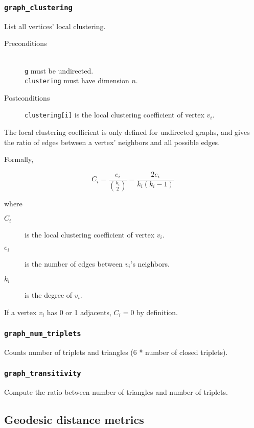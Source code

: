 \documentclass[a4paper,10pt]{article}
\begin{document}
\subsubsection{\texttt{graph\_clustering}}
List all vertices' local clustering.

\begin{description}
 \item[Preconditions] ~\\
   \texttt{g} must be undirected. \\
   \texttt{clustering} must have dimension $n$.
 \item[Postconditions] \texttt{clustering[i]} is the local clustering coefficient
  of vertex $v_i$.
\end{description}


The local clustering coefficient is only defined for undirected graphs, and
gives the ratio of edges between a vertex' neighbors and all possible edges.

Formally,

\begin{equation*}
 C_i = \frac{e_i}{\binom{k_i}{2}} = \frac{2 e_i}{k_i (k_i - 1)}
\end{equation*}

where

\begin{description}
 \item[$C_i$] is the local clustering coefficient of vertex $v_i$.
 \item[$e_i$] is the number of edges between $v_i$'s neighbors.
 \item[$k_i$] is the degree of $v_i$.
\end{description}

If a vertex $v_i$ has 0 or 1 adjacents, $C_i = 0$ by definition.
 
\subsubsection{\texttt{graph\_num\_triplets}}
Counts number of triplets and triangles (6 * number of closed triplets).
\subsubsection{\texttt{graph\_transitivity}}
Compute the ratio between number of triangles and number of triplets.

\subsection{Geodesic distance metrics}
\end{document}
